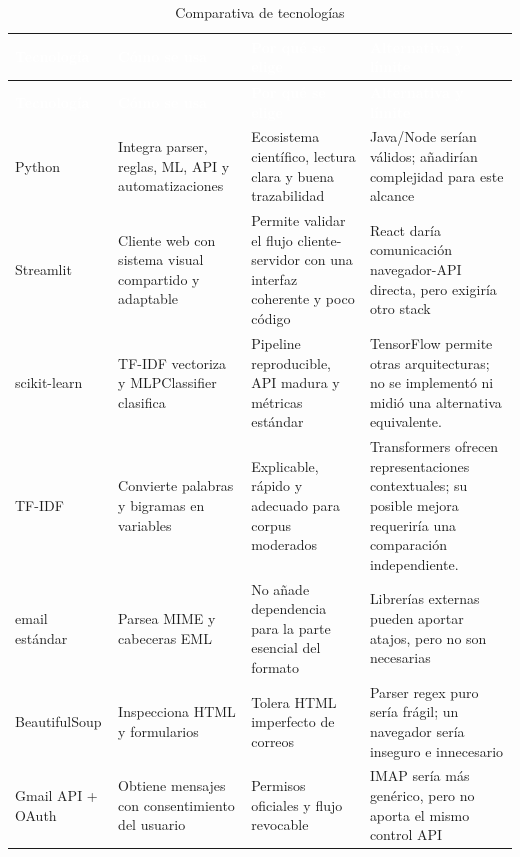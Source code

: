 \documentclass[11pt,a4paper]{article}
\begin{document}
\begingroup
  \small
  \begin{xltabular}{\textwidth}{|>{\raggedright\arraybackslash}p{2.45cm}|X|X|X|}
  \caption{Comparativa de tecnologías}\label{tab:comparativa-1}\\
    \hline
    \textcolor{white}{\textbf{Tecnología}} & \textcolor{white}{\textbf{Cómo se usa}} & \textcolor{white}{\textbf{Por qué se elige}} & \textcolor{white}{\textbf{Alternativa y límite}} \\
    \hline
    \endfirsthead
    \hline
    \textcolor{white}{\textbf{Tecnología}} & \textcolor{white}{\textbf{Cómo se usa}} & \textcolor{white}{\textbf{Por qué se elige}} & \textcolor{white}{\textbf{Alternativa y límite}} \\
    \hline
    \endhead
    Python & Integra parser, reglas, ML, API y automatizaciones & Ecosistema científico, lectura clara y buena trazabilidad & Java/\allowbreak{}Node serían válidos; añadirían complejidad para este alcance \\
    \hline
    Streamlit & Cliente web con sistema visual compartido y adaptable & Permite validar el flujo cliente-servidor con una interfaz coherente y poco código & React daría comunicación navegador-API directa, pero exigiría otro stack \\
    \hline
    scikit-learn & TF-IDF vectoriza y MLPClassifier clasifica & Pipeline reproducible, API madura y métricas estándar & TensorFlow permite otras arquitecturas; no se implementó ni midió una alternativa equivalente. \\
    \hline
    TF-IDF & Convierte palabras y bigramas en variables & Explicable, rápido y adecuado para corpus moderados & Transformers ofrecen representaciones contextuales; su posible mejora requeriría una comparación independiente. \\
    \hline
    email estándar & Parsea MIME y cabeceras EML & No añade dependencia para la parte esencial del formato & Librerías externas pueden aportar atajos, pero no son necesarias \\
    \hline
    BeautifulSoup & Inspecciona HTML y formularios & Tolera HTML imperfecto de correos & Parser regex puro sería frágil; un navegador sería inseguro e innecesario \\
    \hline
    Gmail API + OAuth & Obtiene mensajes con consentimiento del usuario & Permisos oficiales y flujo revocable & IMAP sería más genérico, pero no aporta el mismo control API \\

\end{xltabular}
\end{document}
